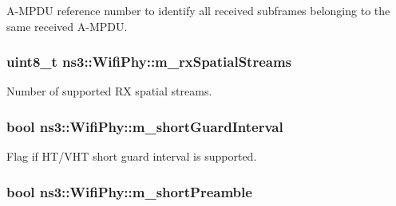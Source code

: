 A-\/\+M\+P\+DU reference number to identify all received subframes belonging to the same received A-\/\+M\+P\+DU. 

\subsubsection[{\texorpdfstring{m\+\_\+rx\+Spatial\+Streams}{m_rxSpatialStreams}}]{\setlength{\rightskip}{0pt plus 5cm}uint8\+\_\+t ns3\+::\+Wifi\+Phy\+::m\+\_\+rx\+Spatial\+Streams\hspace{0.3cm}{\ttfamily [private]}}\hypertarget{classns3_1_1WifiPhy_ab9fec8645bb349ca71409ba5c00d7165}{}\label{classns3_1_1WifiPhy_ab9fec8645bb349ca71409ba5c00d7165}


Number of supported RX spatial streams. 

\subsubsection[{\texorpdfstring{m\+\_\+short\+Guard\+Interval}{m_shortGuardInterval}}]{\setlength{\rightskip}{0pt plus 5cm}bool ns3\+::\+Wifi\+Phy\+::m\+\_\+short\+Guard\+Interval\hspace{0.3cm}{\ttfamily [private]}}\hypertarget{classns3_1_1WifiPhy_a84526e58ca3e8abf87c9223448226416}{}\label{classns3_1_1WifiPhy_a84526e58ca3e8abf87c9223448226416}


Flag if H\+T/\+V\+HT short guard interval is supported. 

\subsubsection[{\texorpdfstring{m\+\_\+short\+Preamble}{m_shortPreamble}}]{\setlength{\rightskip}{0pt plus 5cm}bool ns3\+::\+Wifi\+Phy\+::m\+\_\+short\+Preamble\hspace{0.3cm}{\ttfamily [private]}}\hypertarget{classns3_1_1WifiPhy_ad2df70b891c138ec13289ec813696732}{}\label{classns3_1_1WifiPhy_ad2df70b891c138ec13289ec813696732}


